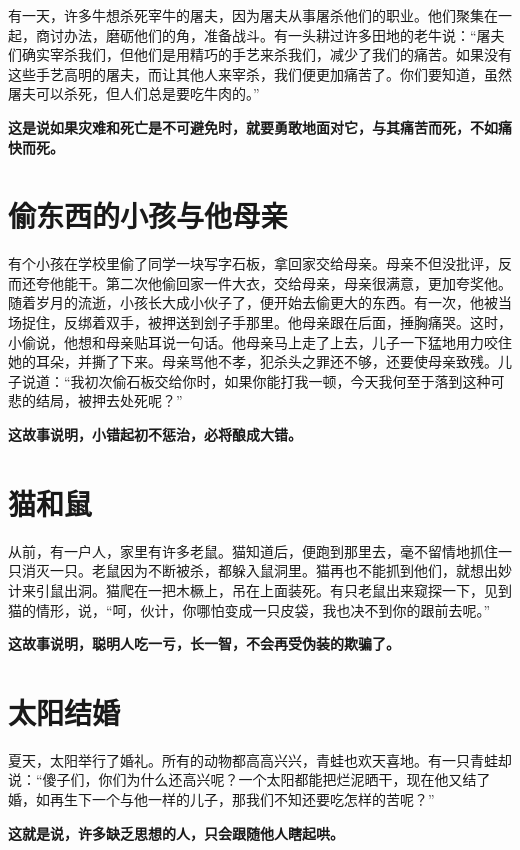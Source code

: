 有一天，许多牛想杀死宰牛的屠夫，因为屠夫从事屠杀他们的职业。他们聚集在一起，商讨办法，磨砺他们的角，准备战斗。有一头耕过许多田地的老牛说：“屠夫们确实宰杀我们，但他们是用精巧的手艺来杀我们，减少了我们的痛苦。如果没有这些手艺高明的屠夫，而让其他人来宰杀，我们便更加痛苦了。你们要知道，虽然屠夫可以杀死，但人们总是要吃牛肉的。”

{\bfseries \color{red}这是说如果灾难和死亡是不可避免时，就要勇敢地面对它，与其痛苦而死，不如痛快而死。}

\section{偷东西的小孩与他母亲}

有个小孩在学校里偷了同学一块写字石板，拿回家交给母亲。母亲不但没批评，反而还夸他能干。第二次他偷回家一件大衣，交给母亲，母亲很满意，更加夸奖他。随着岁月的流逝，小孩长大成小伙子了，便开始去偷更大的东西。有一次，他被当场捉住，反绑着双手，被押送到刽子手那里。他母亲跟在后面，捶胸痛哭。这时，小偷说，他想和母亲贴耳说一句话。他母亲马上走了上去，儿子一下猛地用力咬住她的耳朵，并撕了下来。母亲骂他不孝，犯杀头之罪还不够，还要使母亲致残。儿子说道：“我初次偷石板交给你时，如果你能打我一顿，今天我何至于落到这种可悲的结局，被押去处死呢？”

{\bfseries \color{red}这故事说明，小错起初不惩治，必将酿成大错。}

\section{猫和鼠}

从前，有一户人，家里有许多老鼠。猫知道后，便跑到那里去，毫不留情地抓住一只消灭一只。老鼠因为不断被杀，都躲入鼠洞里。猫再也不能抓到他们，就想出妙计来引鼠出洞。猫爬在一把木橛上，吊在上面装死。有只老鼠出来窥探一下，见到猫的情形，说，“呵，伙计，你哪怕变成一只皮袋，我也决不到你的跟前去呢。”

{\bfseries \color{red}这故事说明，聪明人吃一亏，长一智，不会再受伪装的欺骗了。}

\section{太阳结婚}

夏天，太阳举行了婚礼。所有的动物都高高兴兴，青蛙也欢天喜地。有一只青蛙却说：“傻子们，你们为什么还高兴呢？一个太阳都能把烂泥晒干，现在他又结了婚，如再生下一个与他一样的儿子，那我们不知还要吃怎样的苦呢？”

{\bfseries \color{red}这就是说，许多缺乏思想的人，只会跟随他人瞎起哄。}

